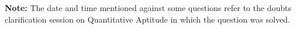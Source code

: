\documentclass{article}
\begin{document}
\noindent 

\noindent \\

\noindent \textbf{\\ Note: }The date and time mentioned against some questions refer to the doubts clarification session on Quantitative Aptitude in which the question was solved.

\noindent 

\noindent 

\noindent 

\noindent 
\end{document}
